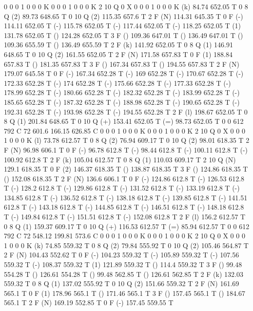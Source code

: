 0 0 0 1 0 0 0 K
0 0 0 1 0 0 0 K
2 10 Q
0 X
0 0 0 1 0 0 0 K
(k) 84.74 652.05 T
0 8 Q
(2) 89.73 648.65 T
0 10 Q
(2) 115.35 657.6 T
2 F
(N) 114.31 645.35 T
0 F
(-) 114.11 652.05 T
(-) 115.78 652.05 T
(-) 117.44 652.05 T
(-) 118.25 652.05 T
(1) 131.78 652.05 T
() 124.28 652.05 T
3 F
() 109.36 647.01 T
() 136.49 647.01 T
() 109.36 655.59 T
() 136.49 655.59 T
2 F
(k) 141.92 652.05 T
0 8 Q
(1) 146.91 648.65 T
0 10 Q
(2) 161.55 652.05 T
2 F
(N) 171.58 657.83 T
0 F
(1) 188.84 657.83 T
() 181.35 657.83 T
3 F
() 167.34 657.83 T
() 194.55 657.83 T
2 F
(N) 179.07 645.58 T
0 F
(-) 167.34 652.28 T
(-) 169 652.28 T
(-) 170.67 652.28 T
(-) 172.33 652.28 T
(-) 174 652.28 T
(-) 175.66 652.28 T
(-) 177.33 652.28 T
(-) 178.99 652.28 T
(-) 180.66 652.28 T
(-) 182.32 652.28 T
(-) 183.99 652.28 T
(-) 185.65 652.28 T
(-) 187.32 652.28 T
(-) 188.98 652.28 T
(-) 190.65 652.28 T
(-) 192.31 652.28 T
(-) 193.98 652.28 T
(-) 194.55 652.28 T
2 F
(l) 198.67 652.05 T
0 8 Q
(1) 201.84 648.65 T
0 10 Q
(+) 153.41 652.05 T
(=) 98.73 652.05 T
0 0 612 792 C
72 601.6 166.15 626.85 C
0 0 0 1 0 0 0 K
0 0 0 1 0 0 0 K
2 10 Q
0 X
0 0 0 1 0 0 0 K
(l) 73.78 612.57 T
0 8 Q
(2) 76.94 609.17 T
0 10 Q
(2) 98.01 618.35 T
2 F
(N) 96.98 606.1 T
0 F
(-) 96.78 612.8 T
(-) 98.44 612.8 T
(-) 100.11 612.8 T
(-) 100.92 612.8 T
2 F
(k) 105.04 612.57 T
0 8 Q
(1) 110.03 609.17 T
2 10 Q
(N) 129.1 618.35 T
0 F
(2) 146.37 618.35 T
() 138.87 618.35 T
3 F
() 124.86 618.35 T
() 152.08 618.35 T
2 F
(N) 136.6 606.1 T
0 F
(-) 124.86 612.8 T
(-) 126.53 612.8 T
(-) 128.2 612.8 T
(-) 129.86 612.8 T
(-) 131.52 612.8 T
(-) 133.19 612.8 T
(-) 134.85 612.8 T
(-) 136.52 612.8 T
(-) 138.18 612.8 T
(-) 139.85 612.8 T
(-) 141.51 612.8 T
(-) 143.18 612.8 T
(-) 144.85 612.8 T
(-) 146.51 612.8 T
(-) 148.18 612.8 T
(-) 149.84 612.8 T
(-) 151.51 612.8 T
(-) 152.08 612.8 T
2 F
(l) 156.2 612.57 T
0 8 Q
(1) 159.37 609.17 T
0 10 Q
(+) 116.53 612.57 T
(=) 85.94 612.57 T
0 0 612 792 C
72 548.12 199.81 573.6 C
0 0 0 1 0 0 0 K
0 0 0 1 0 0 0 K
2 10 Q
0 X
0 0 0 1 0 0 0 K
(k) 74.85 559.32 T
0 8 Q
(2) 79.84 555.92 T
0 10 Q
(2) 105.46 564.87 T
2 F
(N) 104.43 552.62 T
0 F
(-) 104.23 559.32 T
(-) 105.89 559.32 T
(-) 107.56 559.32 T
(-) 108.37 559.32 T
(1) 121.89 559.32 T
() 114.4 559.32 T
3 F
() 99.48 554.28 T
() 126.61 554.28 T
() 99.48 562.85 T
() 126.61 562.85 T
2 F
(k) 132.03 559.32 T
0 8 Q
(1) 137.02 555.92 T
0 10 Q
(2) 151.66 559.32 T
2 F
(N) 161.69 565.1 T
0 F
(1) 178.96 565.1 T
() 171.46 565.1 T
3 F
() 157.45 565.1 T
() 184.67 565.1 T
2 F
(N) 169.19 552.85 T
0 F
(-) 157.45 559.55 T
